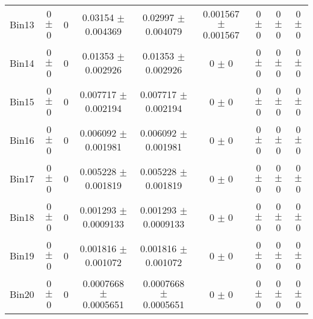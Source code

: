 \begin{tabular}{@{\extracolsep{4pt}}lcccccccc@{}}
     Bin13 & 0 $\pm$ 0 & 0 & 0.03154 $\pm$ 0.004369 & 0.02997 $\pm$ 0.004079 & 0.001567 $\pm$ 0.001567 & 0 $\pm$ 0 & 0 $\pm$ 0 & 0 $\pm$ 0 \\ 
     Bin14 & 0 $\pm$ 0 & 0 & 0.01353 $\pm$ 0.002926 & 0.01353 $\pm$ 0.002926 & 0 $\pm$ 0 & 0 $\pm$ 0 & 0 $\pm$ 0 & 0 $\pm$ 0 \\ 
     Bin15 & 0 $\pm$ 0 & 0 & 0.007717 $\pm$ 0.002194 & 0.007717 $\pm$ 0.002194 & 0 $\pm$ 0 & 0 $\pm$ 0 & 0 $\pm$ 0 & 0 $\pm$ 0 \\ 
     Bin16 & 0 $\pm$ 0 & 0 & 0.006092 $\pm$ 0.001981 & 0.006092 $\pm$ 0.001981 & 0 $\pm$ 0 & 0 $\pm$ 0 & 0 $\pm$ 0 & 0 $\pm$ 0 \\ 
     Bin17 & 0 $\pm$ 0 & 0 & 0.005228 $\pm$ 0.001819 & 0.005228 $\pm$ 0.001819 & 0 $\pm$ 0 & 0 $\pm$ 0 & 0 $\pm$ 0 & 0 $\pm$ 0 \\ 
     Bin18 & 0 $\pm$ 0 & 0 & 0.001293 $\pm$ 0.0009133 & 0.001293 $\pm$ 0.0009133 & 0 $\pm$ 0 & 0 $\pm$ 0 & 0 $\pm$ 0 & 0 $\pm$ 0 \\ 
     Bin19 & 0 $\pm$ 0 & 0 & 0.001816 $\pm$ 0.001072 & 0.001816 $\pm$ 0.001072 & 0 $\pm$ 0 & 0 $\pm$ 0 & 0 $\pm$ 0 & 0 $\pm$ 0 \\ 
     Bin20 & 0 $\pm$ 0 & 0 & 0.0007668 $\pm$ 0.0005651 & 0.0007668 $\pm$ 0.0005651 & 0 $\pm$ 0 & 0 $\pm$ 0 & 0 $\pm$ 0 & 0 $\pm$ 0 \\ 
\hline\hline
  \end{tabular}
